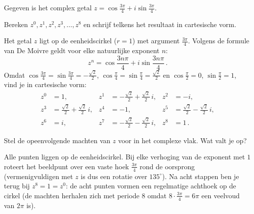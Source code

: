 \documentclass{ximera}
\begin{document}
\begin{exercise}
    Gegeven is het complex getal \(z = \cos\frac{3\pi}{4} + i\sin\frac{3\pi}{4}\). 
    \begin{question}
        Bereken \(z^0, z^1, z^2, z^3, \dots, z^8 \) en schrijf telkens het resultaat in cartesische vorm. 
        \begin{oplossing}\nl
            Het getal \(z\) ligt op de eenheidscirkel (\(r=1\)) met argument \(\frac{3\pi}{4}\). Volgens de formule van De Moivre geldt voor elke natuurlijke exponent \(n\):
            \[
                z^n = \cos\frac{3n\pi}{4} + i\sin\frac{3n\pi}{4}\,.
            \]
            Omdat \(\cos\frac{3\pi}{4}=\sin\frac{3\pi}{4}=-\frac{\sqrt{2}}{2}\), \(\cos\frac{\pi}{4}=\sin\frac{\pi}{4}=\frac{\sqrt{2}}{2}\) en \(\cos\frac{\pi}{2}=0\), \(\sin\frac{\pi}{2}=1\), vind je in cartesische vorm:
            \begin{align*}
                z^0 &= 1, &
                z^1 &= -\frac{\sqrt{2}}{2}+\frac{\sqrt{2}}{2}\,i, &
                z^2 &= -i, \\
                z^3 &= \frac{\sqrt{2}}{2}+\frac{\sqrt{2}}{2}\,i, &
                z^4 &= -1, &
                z^5 &= \frac{\sqrt{2}}{2}-\frac{\sqrt{2}}{2}\,i, \\
                z^6 &= i, &
                z^7 &= -\frac{\sqrt{2}}{2}-\frac{\sqrt{2}}{2}\,i, &
                z^8 &= 1\,.
            \end{align*}
        \end{oplossing}
    \end{question}
    \begin{question}
        Stel de opeenvolgende machten van \(z\) voor in het complexe vlak. Wat valt je op? 
        \begin{oplossing}\nl
            Alle punten liggen op de eenheidscirkel. Bij elke verhoging van de exponent met \(1\) roteert het beeldpunt over een vaste hoek \(\frac{3\pi}{4}\) rond de oorsprong (vermenigvuldigen met \(z\) is dus een rotatie over \(135^\circ\)). Na acht stappen ben je terug bij \(z^8=1=z^0\): de acht punten vormen een regelmatige achthoek op de cirkel (de machten herhalen zich met periode \(8\) omdat \(8\cdot\frac{3\pi}{4}=6\pi\) een veelvoud van \(2\pi\) is).


\end{oplossing}
\end{question}
\end{exercise}
\end{document}
